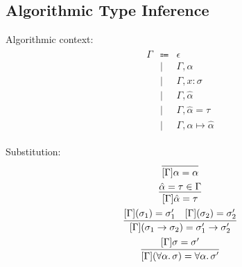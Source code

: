 \subsection{Algorithmic Type Inference}

Algorithmic context:
\begin{align*}
  \begin{array}{rcl}
    \Gamma &\Coloneq &\epsilon \\
    &\mid &\Gamma, \alpha \\
    &\mid &\Gamma, x: \sigma \\
    &\mid &\Gamma, \hat{\alpha} \\
    &\mid &\Gamma, \hat{\alpha} = \tau \\
    &\mid &\Gamma, \alpha \mapsto \hat{\alpha}
  \end{array}
\end{align*}

Substitution:
\begin{gather*}
  \infer{[\Gamma]\alpha = \alpha}{}
  \\
  \infer{[\Gamma]\hat{\alpha} = \tau}{
    \hat{\alpha} = \tau \in \Gamma
  }
  \\
  \infer{[\Gamma](\sigma_1 \to \sigma_2) = \sigma_1' \to \sigma_2'}{
    [\Gamma](\sigma_1) = \sigma_1'
    &
    [\Gamma](\sigma_2) = \sigma_2'
  }
  \\
  \infer{[\Gamma](\forall \alpha\ldotp \sigma) = \forall \alpha\ldotp \sigma'}{
    [\Gamma]\sigma = \sigma'
  }
\end{gather*}

